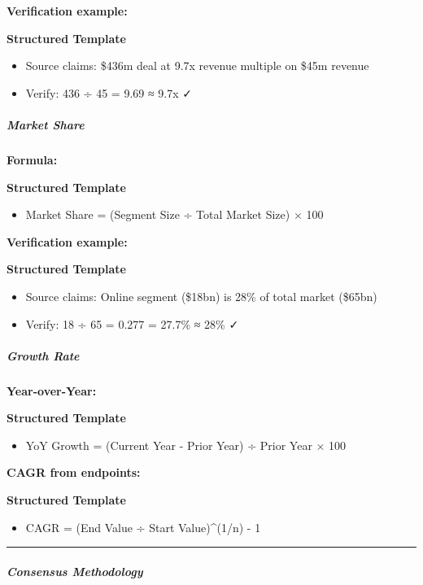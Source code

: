 \documentclass[11pt]{article}
\begin{document}
\textbf{Verification example:}

\textbf{Structured Template}
\begin{itemize}[leftmargin=*,itemsep=2pt,topsep=2pt]
\item {} Source claims: \$436m deal at 9.7x revenue multiple on \$45m revenue
\item {} Verify: 436 ÷ 45 = 9.69 ≈ 9.7x ✓
\end{itemize}

\subparagraph{Market Share}\mbox{}\par

\textbf{Formula:}

\textbf{Structured Template}
\begin{itemize}[leftmargin=*,itemsep=2pt,topsep=2pt]
\item {} Market Share = (Segment Size ÷ Total Market Size) × 100
\end{itemize}

\textbf{Verification example:}

\textbf{Structured Template}
\begin{itemize}[leftmargin=*,itemsep=2pt,topsep=2pt]
\item {} Source claims: Online segment (\$18bn) is 28\% of total market (\$65bn)
\item {} Verify: 18 ÷ 65 = 0.277 = 27.7\% ≈ 28\% ✓
\end{itemize}

\subparagraph{Growth Rate}\mbox{}\par

\textbf{Year-over-Year:}

\textbf{Structured Template}
\begin{itemize}[leftmargin=*,itemsep=2pt,topsep=2pt]
\item {} YoY Growth = (Current Year - Prior Year) ÷ Prior Year × 100
\end{itemize}

\textbf{CAGR from endpoints:}

\textbf{Structured Template}
\begin{itemize}[leftmargin=*,itemsep=2pt,topsep=2pt]
\item {} CAGR = (End Value ÷ Start Value)\textasciicircum{}(1/n) - 1
\end{itemize}

\vspace{0.5em}\hrule\vspace{0.5em}

\subparagraph{Consensus Methodology}\mbox{}\par
\end{document}
